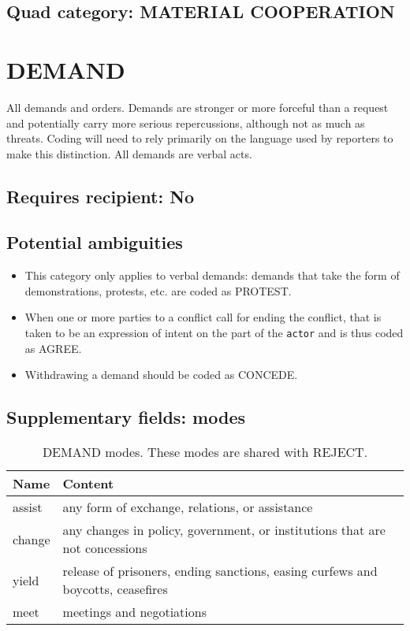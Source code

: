 \documentclass[11pt]{report}
\newcommand{\plcat}[1]{\textsf{#1}}
\newcommand{\txt}[1]{\texttt{#1}}
\begin{document}
\subsection{Quad category: MATERIAL COOPERATION}



\newpage  

\section{DEMAND}

All demands and orders. Demands are stronger or more forceful than a request and potentially carry more serious repercussions, although not as much as threats. Coding will need to rely primarily on the language used by reporters to make this distinction.  All demands are verbal acts. 

\subsection{Requires recipient: No}


\subsection{Potential ambiguities}

\begin{itemize}
\item This category only applies to verbal demands: demands that take the form of demonstrations, protests, etc. are coded as \plcat{PROTEST}.
\item When one or more parties to a conflict call for ending the conflict, that is taken to be an expression of intent on the part of the \txt{actor} and is thus coded as \plcat{AGREE}.
\item Withdrawing a demand should be coded as \plcat{CONCEDE}.

\end{itemize}


\subsection{Supplementary fields: modes}


\begin{table}[htp]
\caption{DEMAND modes. These modes are shared with REJECT.}
\begin{center}
\begin{tabular}{|l|p{13cm}|}
\hline
Name & Content \\
\hline
assist & any form of exchange, relations, or assistance\\
change & any changes in policy, government, or institutions that are not concessions \\
yield & release of prisoners, ending sanctions, easing curfews and boycotts, ceasefires\\
meet & meetings and negotiations\\
\hline
\end{tabular}
\end{center}
\label{tab:demandmode2}
\end{table}%
\end{document}
